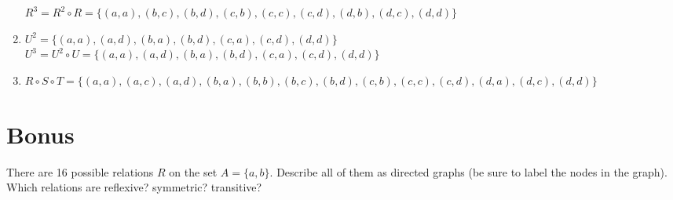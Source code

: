 \begin{questions}
\begin{solution}
\begin{enumerate}[label=(\alph*),itemsep=3pt,parsep=0pt,topsep=0pt,partopsep=0pt]
        $R^3 = R^2 \circ R = \{ (a,a), (b,c), (b,d), (c,b), (c,c), (c,d), (d,b), (d,c), (d,d) \}$
        \item $U^2 = \{ (a,a), (a,d), (b,a), (b,d), (c,a), (c,d), (d,d)\}$ \\
        $U^3 = U^2 \circ U = \{ (a,a), (a,d), (b,a), (b,d), (c,a), (c,d), (d,d) \}$
        \item $R \circ S \circ T = \{ (a,a), (a,c), (a,d), (b,a), (b,b), (b,c), (b,d), (c,b), (c,c), (c,d), (d,a), (d,c), (d,d) \}$ 
    \end{enumerate}
    \end{solution}


\section*{Bonus}

\bonusquestion[2]   There are 16 possible relations $R$ on the set $A = \{a, b\}$.  Describe all of them as directed graphs (be sure to label the nodes in the graph).  Which relations are reflexive? symmetric? transitive?

\begin{solution}


\end{solution}

\end{questions}



